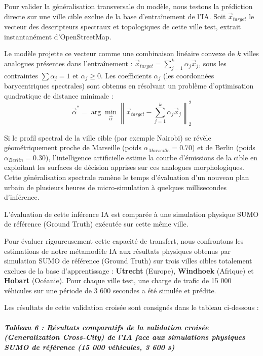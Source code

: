 \documentclass[10pt, a4paper]{article}
\begin{document}
Pour valider la généralisation transversale du modèle, nous testons la
prédiction directe sur une ville cible exclue de la base d'entraînement
de l'IA. Soit \(\vec{x}_{target}\) le vecteur des descripteurs spectraux
et topologiques de cette ville test, extrait instantanément
d'OpenStreetMap.

Le modèle projette ce vecteur comme une combinaison linéaire convexe de
\(k\) villes analogues présentes dans l'entraînement :
\(\vec{x}_{target} = \sum_{j=1}^k \alpha_j \vec{x}_j\), sous les
contraintes \(\sum \alpha_j = 1\) et \(\alpha_j \ge 0\). Les
coefficients \(\alpha_j\) (les coordonnées barycentriques spectrales)
sont obtenus en résolvant un problème d'optimisation quadratique de
distance minimale :
\[\vec{\alpha}^* = \arg\min_{\vec{\alpha}} \left\| \vec{x}_{target} - \sum_{j=1}^k \alpha_j \vec{x}_j \right\|_2^2\]

Si le profil spectral de la ville cible (par exemple Nairobi) se révèle
géométriquement proche de Marseille (poids
\(\alpha_{Marseille} = 0.70\)) et de Berlin (poids
\(\alpha_{Berlin} = 0.30\)), l'intelligence artificielle estime la
courbe d'émissions de la cible en exploitant les surfaces de décision
apprises sur ces analogues morphologiques. Cette généralisation
spectrale ramène le temps d'évaluation d'un nouveau plan urbain de
plusieurs heures de micro-simulation à quelques millisecondes
d'inférence.

L'évaluation de cette inférence IA est comparée à une simulation
physique SUMO de référence (Ground Truth) exécutée sur cette même ville.

Pour évaluer rigoureusement cette capacité de transfert, nous
confrontons les estimations de notre métamodèle IA aux résultats
physiques obtenus par simulation SUMO de référence (Ground Truth) sur
trois villes cibles totalement exclues de la base d'apprentissage :
\textbf{Utrecht} (Europe), \textbf{Windhoek} (Afrique) et
\textbf{Hobart} (Océanie). Pour chaque ville test, une charge de trafic
de 15 000 véhicules sur une période de 3 600 secondes a été simulée et
prédite.

Les résultats de cette validation croisée sont consignés dans le tableau
ci-dessous :

\subparagraph{Tableau 6 : Résultats comparatifs de la validation croisée
(Generalization Cross-City) de l'IA face aux simulations physiques SUMO
de référence (15 000 véhicules, 3 600
s)}\label{tableau-6-ruxe9sultats-comparatifs-de-la-validation-croisuxe9e-generalization-cross-city-de-lia-face-aux-simulations-physiques-sumo-de-ruxe9fuxe9rence-15-000-vuxe9hicules-3-600-s}
\end{document}
